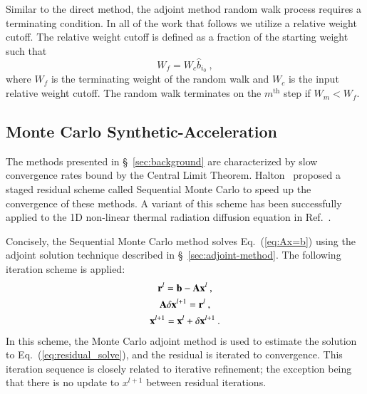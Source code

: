 \documentclass[preprint,12pt]{elsarticle}
\newcommand{\vA}{\ensuremath{\ve{A}}}
\newcommand{\vb}{\ensuremath{\ve{b}}}
\newcommand{\vx}{\ensuremath{\ve{x}}}
\newcommand{\vr}{\ensuremath{\ve{r}}}
\begin{document}
Similar to the direct method, the adjoint method random walk process
requires a terminating condition.  In all of the work that follows we
utilize a relative weight cutoff.  The relative weight cutoff is
defined as a fraction of the starting weight such that
\begin{equation}
  W_f = W_c\hat{b}_{i_0}\:,
  \label{eq:weight_cutoff}
\end{equation}
where $W_f$ is the terminating weight of the random walk and $W_c$ is
the input relative weight cutoff. The random walk terminates on the
$m^\text{th}$ step if $W_m < W_f$.

\subsection{Monte Carlo Synthetic-Acceleration}
\label{sec:iter-refin-monte}

The methods presented in \S~\ref{sec:background} are characterized by slow
convergence rates bound by the Central Limit Theorem.
Halton~\cite{halton_1962,halton_1994} proposed a staged residual scheme called
Sequential Monte Carlo to speed up the convergence of these methods.  A
variant of this scheme has been successfully applied to the 1D non-linear
thermal radiation diffusion equation in Ref.~\cite{evans_2003}.

Concisely, the Sequential Monte Carlo method solves Eq.~(\ref{eq:Ax=b}) using
the adjoint solution technique described in \S~\ref{sec:adjoint-method}.  The
following iteration scheme is applied:
\begin{subequations}
  \begin{gather}
    \vr^{l} = \vb - \vA\vx^{l}\:, \\ \vA\delta\vx^{l+1} =
    \vr^{l}\:, \label{eq:residual_solve}\\ \vx^{l+1} = \vx^{l} +
    \delta\vx^{l+1}\:.
  \end{gather}
\end{subequations}
In this scheme, the Monte Carlo adjoint method is used to estimate the
solution to Eq.~(\ref{eq:residual_solve}), and the residual is iterated to
convergence.  This iteration sequence is closely related to iterative
refinement; the exception being that there is no update to $x^{l+1}$ between
residual iterations.
\end{document}
